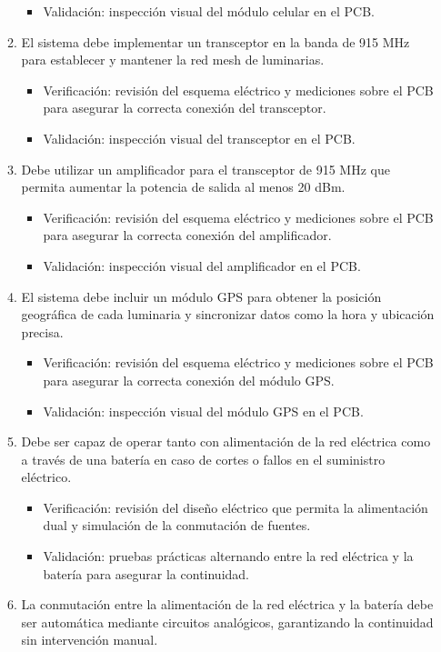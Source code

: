 \documentclass[
11pt, %
]{charter}
\begin{document}
\begin{enumerate}
\begin{enumerate}
\begin{itemize}
				\item Validación: inspección visual del módulo celular en el PCB.
				\end{itemize}
			\item El sistema debe implementar un transceptor en la banda de 915 MHz para establecer y mantener la red mesh de luminarias.
				\begin{itemize}
				\item Verificación: revisión del esquema eléctrico y mediciones sobre el PCB para asegurar la correcta conexión del transceptor. 
				\item Validación: inspección visual del transceptor en el PCB.
				\end{itemize}
			\item Debe utilizar un amplificador para el transceptor de 915 MHz que permita aumentar la potencia de salida al menos 20 dBm.
				\begin{itemize}
				\item Verificación: revisión del esquema eléctrico y mediciones sobre el PCB para asegurar la correcta conexión del amplificador. 
				\item Validación: inspección visual del amplificador en el PCB.
				\end{itemize}
			\item El sistema debe incluir un módulo GPS para obtener la posición geográfica de cada luminaria y sincronizar datos como la hora y ubicación precisa.
				\begin{itemize}
				\item Verificación: revisión del esquema eléctrico y mediciones sobre el PCB para asegurar la correcta conexión del módulo GPS. 
				\item Validación: inspección visual del módulo GPS en el PCB.
				\end{itemize}
			\item Debe ser capaz de operar tanto con alimentación de la red eléctrica como a través de una batería en caso de cortes o fallos en el suministro eléctrico. 
				\begin{itemize}
				\item Verificación: revisión del diseño eléctrico que permita la alimentación dual y simulación de la conmutación de fuentes.
				\item Validación: pruebas prácticas alternando entre la red eléctrica y la batería para asegurar la continuidad.
				\end{itemize}
			\item La conmutación entre la alimentación de la red eléctrica y la batería debe ser automática mediante circuitos analógicos, garantizando la continuidad sin intervención manual.

\end{enumerate}
\end{enumerate}
\end{document}
